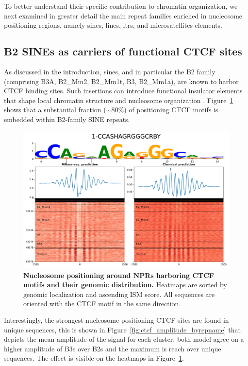 \documentclass[11pt]{book}
\begin{document}
To better understand their specific contribution to chromatin organization, we next examined in greater detail the main repeat families enriched in nucleosome positioning regions, namely \glspl{sine}, \glspl{line}, \glspl{ltr}, and microsatellites elements.

\FloatBarrier
\subsection{B2 SINEs as carriers of functional CTCF sites}

As discussed in the introduction, \glspl{sine}, and in particular the B2 family (comprising B3A, B2\_Mm2, B2\_Mm1t, B3, B2\_Mm1a), are known to harbor CTCF binding sites. Such insertions can introduce functional insulator elements that shape local chromatin structure and nucleosome organization \cite{schmidt_waves_2012}. Figure~\ref{fig:ctcf_nprs_on_genome} shows that a substantial fraction ($\sim$80\%) of positioning CTCF motifs is embedded within B2-family SINE repeats.

\begin{figure}[htbp]
    \centering
    \includegraphics[width=\textwidth]{Figures/Results/xstreme_onrep_meta_hm/1-CCASHAGRGGGCRBY.pdf}
    \caption{\textbf{Nucleosome positioning around NPRs harboring CTCF motifs and their genomic distribution.} Heatmaps are sorted by genomic localization and ascending ISM score. All sequences are oriented with the CTCF motif in the same direction.} 
    \label{fig:ctcf_nprs_on_genome}
\end{figure}

Interestingly, the strongest nucleosome-positioning CTCF sites are found in unique sequences, this is shown in Figure~\ref{fig:ctcf_amplitude_byrepname} that depicts the mean amplitude of the signal for each cluster, both model agree on a higher amplitude of B3s over B2s and the maximum is reach over unique sequences. The effect is visible on the heatmaps in Figure~\ref{fig:ctcf_nprs_on_genome}. 
\end{document}
